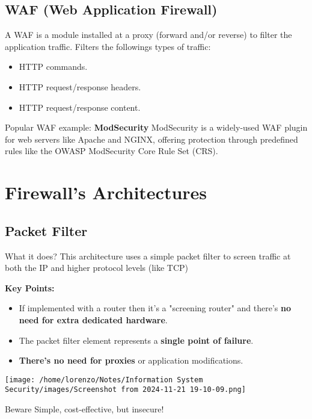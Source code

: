 \subsection{WAF (Web Application Firewall)}
A WAF is a module installed at a proxy (forward and/or reverse) to filter the application traffic. Filters the followings types of traffic:
\begin{itemize}
    \item HTTP commands.
    \item HTTP request/response headers.
    \item HTTP request/response content.
\end{itemize}
\begin{quotebox-grey}{Popular WAF example: \textbf{ModSecurity}}
    ModSecurity is a widely-used WAF plugin for web servers like Apache and NGINX, offering protection through predefined rules like the OWASP ModSecurity Core Rule Set (CRS).
\end{quotebox-grey}

\section{Firewall's Architectures}
\subsection{Packet Filter}
\vspace{0.2cm}
\begin{quotebox-yellow}{What it does?}
This architecture uses a simple packet filter to screen traffic at both the IP and higher protocol levels (like TCP)
\end{quotebox-yellow}
\vspace{0.5cm}
\begin{minipage}{0.5\textwidth}
    \vspace{-0.5cm}
    \textbf{Key Points:}
    \begin{itemize}
        \item If implemented with a router then it's a "screening router" and there's \textbf{no need for extra dedicated hardware}.
        \item The packet filter element represents a \textbf{single point of failure}.
        \item \textbf{There's no need for proxies} or application modifications.
    \end{itemize}
\end{minipage}
\hfill
\begin{minipage}{0.5\textwidth}
    \centering
    \texttt{[image: /home/lorenzo/Notes/Information System Security/images/Screenshot from 2024-11-21 19-10-09.png]}
\end{minipage}
\begin{center}
    \begin{quotebox-red}{Beware}
        Simple, cost-effective, but insecure!
        \end{quotebox-red}   
\end{center}
\vspace{0.5cm}
